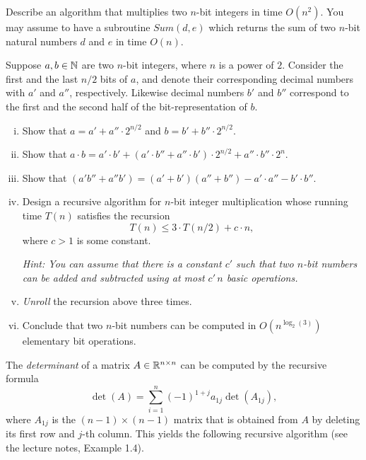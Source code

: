 \documentclass[11pt]{article}
\institute{\'Ecole Polytechnique F\'ed\'erale de Lausanne}
\begin{document}
\makeheader


\problem
Describe an algorithm that multiplies two $n$-bit integers in time $O(n^2)$. You may assume to have a subroutine $Sum(d,e)$ which returns the sum of two $n$-bit natural numbers $d$ and $e$ in time $O(n)$.
 
\problem Suppose $a,b \in \mathbb{N}$ are two $n$-bit integers, where $n$ is a power of $2$. Consider the first and the last $n/2$ bits of $a$, and denote their corresponding decimal numbers with $a'$ and $a''$, respectively. Likewise decimal numbers $b'$ and $b''$ correspond to the first and the second half of the bit-representation of $b$. 
  \begin{enumerate}[i)]
  \item Show that $a = a' + a'' \cdot 2^{n/2}$ and  $b = b' + b'' \cdot 2^{n/2}$.
  \item Show that $a \cdot b = a' \cdot b' + (a' \cdot b'' + a'' \cdot b') \cdot 2^{n/2} + a'' \cdot b'' \cdot 2^n $. 
  \item Show that $(a'b''+a''b') = (a'+b')(a''+b'') - a'\cdot a'' - b'\cdot b''$. 
  \item Design a recursive algorithm for $n$-bit integer multiplication whose running time $T(n)$  satisfies the recursion 
    \begin{displaymath}
      T(n) \leq  3 \cdot T( n/2  ) + c \cdot n,
    \end{displaymath}
where $c>1$ is some constant. 

\emph{Hint: You can assume that there is a constant $c'$ such that two $n$-bit numbers can be added and subtracted using at most $c'\, n$ basic operations. }

\item \emph{Unroll} the recursion above three times. 

\item Conclude that two $n$-bit
    numbers can be computed in $O(n^{\log_2(3)})$
    elementary bit operations. 
  \end{enumerate}
  
\problem 
The \emph{determinant} of a matrix $A \in \mathbb{R}^{n \times n}$ can be computed by the recursive formula 
\begin{displaymath}
  \det(A) = \sum_{i=1}^n (-1)^{1+j}a_{1j} \det(A_{1j}),
\end{displaymath}
where $A_{1j}$ is the $(n-1)×(n-1)$ matrix that is obtained from $A$ by deleting its first row and $j$-th column.  This yields the following recursive algorithm (see the lecture notes, Example 1.4). 
\end{document}
